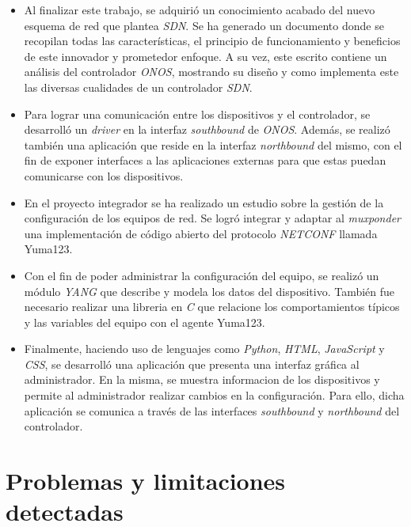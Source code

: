 \begin{itemize}

    \item Al finalizar este trabajo, se adquirió un conocimiento acabado del nuevo esquema de red que plantea  \textit{SDN}. Se ha generado un documento donde se recopilan todas las características, el principio de funcionamiento y beneficios de este innovador y prometedor enfoque. A su vez, este escrito contiene un análisis del controlador \textit{ONOS}, mostrando su diseño y como implementa este las diversas cualidades de un controlador  \textit{SDN}.
    
    \item Para lograr una comunicación entre los dispositivos y el controlador, se desarrolló un \textit{driver} en la interfaz \textit{southbound} de \textit{ONOS}. Además, se realizó también una aplicación que reside en la interfaz \textit{northbound} del mismo, con el fin de exponer interfaces a las aplicaciones externas para que estas puedan comunicarse con los dispositivos. 

    \item En el proyecto integrador se ha realizado un estudio sobre la gestión de la configuración de los equipos de red. Se logró integrar y adaptar al \textit{muxponder} una implementación de código abierto del protocolo \textit{NETCONF} llamada Yuma123. 
    
    \item Con el fin de poder administrar la configuración del equipo, se realizó un módulo \textit{YANG} que describe y modela los datos del dispositivo. También fue necesario realizar una libreria en \textit{C} que relacione los comportamientos típicos y las variables del equipo con el agente Yuma123.

    \item Finalmente, haciendo uso de lenguajes como \textit{Python}, \textit{HTML}, \textit{JavaScript} y \textit{CSS}, se desarrolló una aplicación que presenta una interfaz gráfica al administrador. En la misma, se muestra informacion de los dispositivos y permite al administrador realizar cambios en la configuración. Para ello, dicha aplicación se comunica a través de las interfaces \textit{southbound} y \textit{northbound} del controlador. 

\end{itemize}


\section{Problemas y limitaciones detectadas} \label{problemasylimi}

